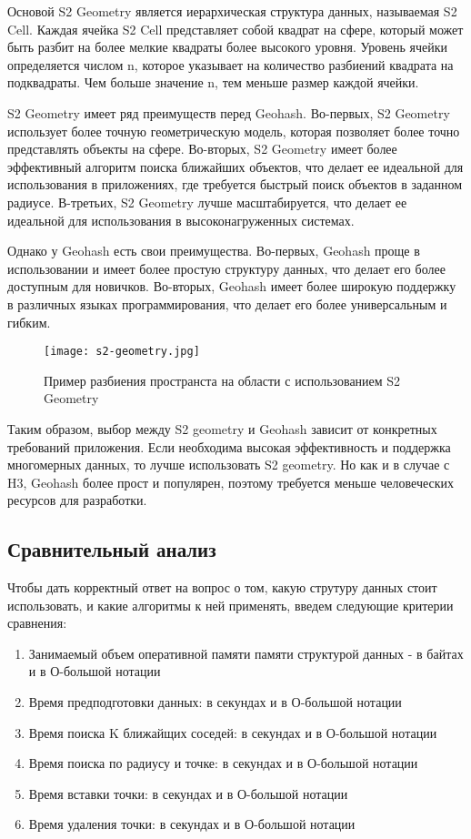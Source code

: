 Основой S2 Geometry является иерархическая структура данных, называемая S2 Cell. Каждая ячейка S2 Cell представляет собой квадрат на сфере, который может быть разбит на более мелкие квадраты более высокого уровня. Уровень ячейки определяется числом n, которое указывает на количество разбиений квадрата на подквадраты. Чем больше значение n, тем меньше размер каждой ячейки.

S2 Geometry имеет ряд преимуществ перед Geohash. Во-первых, S2 Geometry использует более точную геометрическую модель, которая позволяет более точно представлять объекты на сфере. Во-вторых, S2 Geometry имеет более эффективный алгоритм поиска ближайших объектов, что делает ее идеальной для использования в приложениях, где требуется быстрый поиск объектов в заданном радиусе. В-третьих, S2 Geometry лучше масштабируется, что делает ее идеальной для использования в высоконагруженных системах.

Однако у Geohash есть свои преимущества. Во-первых, Geohash проще в использовании и имеет более простую структуру данных, что делает его более доступным для новичков. Во-вторых, Geohash имеет более широкую поддержку в различных языках программирования, что делает его более универсальным и гибким.


\begin{figure}[h]
    \centering
    \texttt{[image: s2-geometry.jpg]}
    \caption{Пример разбиения пространста на области с использованием S2 Geometry}
\end{figure}

Таким образом, выбор между S2 geometry и Geohash зависит от конкретных требований приложения. Если необходима высокая эффективность и поддержка многомерных данных, то лучше использовать S2 geometry. Но как и в случае с H3, Geohash более прост и популярен, поэтому требуется меньше человеческих ресурсов для разработки.

\subsection{Сравнительный анализ}
Чтобы дать корректный ответ на вопрос о том, какую струтуру данных стоит использовать, и какие алгоритмы к ней применять, введем следующие критерии сравнения:
\begin{enumerate}
    \item Занимаемый объем оперативной памяти памяти структурой данных - в байтах и в О-большой нотации
    \item Время предподготовки данных: в секундах и в О-большой нотации
    \item Время поиска K ближайщих соседей: в секундах и в О-большой нотации
    \item Время поиска по радиусу и точке: в секундах и в О-большой нотации
    \item Время вставки точки: в секундах и в О-большой нотации
    \item Время удаления точки: в секундах и в О-большой нотации
\end{enumerate}

